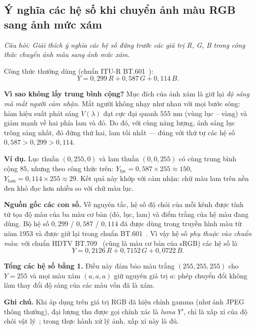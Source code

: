 \subsection{Ý nghĩa các hệ số khi chuyển ảnh màu RGB sang ảnh mức xám}
\label{subsec:w4_gray}

\textit{Câu hỏi: Giải thích ý nghĩa các hệ số đứng trước các giá trị R, G, B trong công thức chuyển ảnh màu sang ảnh mức xám.}

Công thức thường dùng (chuẩn ITU-R BT.601~\citep{itu2011bt601}):
\begin{equation}
Y = 0{,}299\, R + 0{,}587\, G + 0{,}114\, B.
\end{equation}

\textbf{Vì sao không lấy trung bình cộng?} Mục đích của ảnh xám là giữ lại \emph{độ sáng mà mắt người cảm nhận}. Mắt người không nhạy như nhau với mọi bước sóng: hàm hiệu suất phát sáng $V(\lambda)$ đạt cực đại quanh $555$ nm (vùng lục -- vàng) và giảm mạnh về hai phía lam và đỏ. Do đó, với cùng năng lượng, ánh sáng lục trông sáng nhất, đỏ đứng thứ hai, lam tối nhất — đúng với thứ tự các hệ số $0{,}587 > 0{,}299 > 0{,}114$.

\textbf{Ví dụ.} Lục thuần $(0, 255, 0)$ và lam thuần $(0, 0, 255)$ có cùng trung bình cộng $85$, nhưng theo công thức trên: $Y_{\text{lục}} = 0{,}587 \times 255 \approx 150$, $Y_{\text{lam}} = 0{,}114 \times 255 \approx 29$. Kết quả này khớp với cảm nhận: chữ màu lam trên nền đen khó đọc hơn nhiều so với chữ màu lục.

\textbf{Nguồn gốc các con số.} Về nguyên tắc, hệ số độ chói của mỗi kênh được tính từ tọa độ màu của ba màu cơ bản (đỏ, lục, lam) và điểm trắng của hệ màu đang dùng. Bộ hệ số $0{,}299$ / $0{,}587$ / $0{,}114$ đã được dùng trong truyền hình màu từ năm 1953 và được giữ lại trong chuẩn BT.601~\citep{poynton2012digital,itu2011bt601}. Vì vậy hệ số \emph{phụ thuộc vào chuẩn màu}: với chuẩn HDTV BT.709~\citep{itu2015bt709} (cũng là màu cơ bản của sRGB) các hệ số là
\begin{equation}
Y = 0{,}2126\, R + 0{,}7152\, G + 0{,}0722\, B.
\end{equation}

\textbf{Tổng các hệ số bằng 1.} Điều này đảm bảo màu trắng $(255, 255, 255)$ cho $Y = 255$ và mọi màu xám $(a, a, a)$ giữ nguyên giá trị $a$: phép chuyển đổi không làm thay đổi độ sáng của các màu vốn đã là xám.

\textbf{Ghi chú.} Khi áp dụng trên giá trị RGB đã hiệu chỉnh gamma (như ảnh JPEG thông thường), đại lượng thu được gọi chính xác là \emph{luma} $Y'$, chỉ là xấp xỉ của độ chói vật lý~\citep{poynton2012digital}; trong thực hành xử lý ảnh, xấp xỉ này là đủ.

